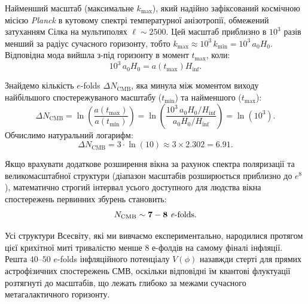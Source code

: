 Найменший масштаб (максимальне $k_{\mathrm{max}}$), який надійно зафіксований космічною місією \emph{Planck} в кутовому спектрі температурної анізотропії, обмежений затуханням Сілка на мультиполях $\ell \sim 2500$. Цей масштаб приблизно в $10^3$ разів менший за радіус сучасного горизонту, тобто $k_{\mathrm{max}} \approx 10^3 \, k_{\mathrm{min}} = 10^3 \, a_0 H_0$. Відповідна мода вийшла з-під горизонту в момент $t_{\mathrm{max}}$, коли:
\begin{equation}
10^3 \, a_0 H_0 = a(t_{\mathrm{max}}) H_{\mathrm{inf}}.
\end{equation}

Знайдемо кількість $e$-folds $\Delta N_{\mathrm{CMB}}$, яка минула між моментом виходу найбільшого спостережуваного масштабу ($t_{\mathrm{min}}$) та найменшого ($t_{\mathrm{max}}$):
\begin{equation}
\Delta N_{\mathrm{CMB}} = \ln \left( \frac{a(t_{\mathrm{max}})}{a(t_{\mathrm{min}})} \right) = \ln \left( \frac{10^3 \, a_0 H_0 / H_{\mathrm{inf}}}{a_0 H_0 / H_{\mathrm{inf}}} \right) = \ln(10^3).
\end{equation}
Обчислимо натуральний логарифм:
\begin{equation}
\Delta N_{\mathrm{CMB}} = 3 \cdot \ln(10) \approx 3 \times 2.302 = \mathbf{6.91}.
\end{equation}

Якщо врахувати додаткове розширення вікна за рахунок спектра поляризації та великомасштабної структури (діапазон масштабів розширюється приблизно до $e^8$), математично строгий інтервал усього доступного для людства вікна спостережень первинних збурень становить:
\begin{equation}
N_{\mathrm{CMB}} \sim \mathbf{7 - 8 \text{ \textit{e}-folds}}.
\end{equation}

Усі структури Всесвіту, які ми вивчаємо експериментально, народилися протягом цієї крихітної миті тривалістю менше 8 е-фолдів на самому фіналі інфляції. Решта $40$--$50$ $e$-folds інфляційного потенціалу $V(\phi)$ назавжди стерті для прямих астрофізичних спостережень СМВ, оскільки відповідні їм квантові флуктуації розтягнуті до масштабів, що лежать глибоко за межами сучасного метагалактичного горизонту.
